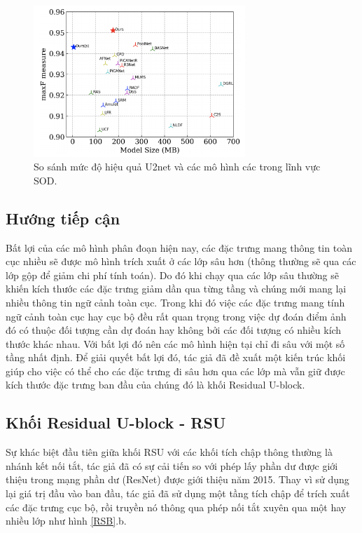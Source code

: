 \begin{figure}[H]
	\begin{center}
		\includegraphics[width=8cm]{images/blood/u2_benk.png}
		\caption{So sánh mức độ hiệu quả U2net và các mô hình các trong lĩnh vực SOD\cite{u2-net}.}
		\label{BenU2net}
	\end{center}
\end{figure}
\vspace{-1.0cm}

\subsection{Hướng tiếp cận}
Bất lợi của các mô hình phân đoạn hiện nay, các đặc trưng mang thông tin toàn cục nhiều sẽ được mô hình trích xuất ở các lớp sâu hơn (thông thường sẽ qua các lớp gộp để giảm chi phí tính toán). Do đó khi chạy qua các lớp sâu thường sẽ khiến kích thước các đặc trưng giảm dần qua từng tầng và chúng mới mang lại nhiều thông tin ngữ cảnh toàn cục. Trong khi đó việc các đặc trưng mang tính ngữ cảnh toàn cục hay cục bộ đều rất quan trọng trong việc dự đoán điểm ảnh đó có thuộc đối tượng cần dự đoán hay không bởi các đối tượng có nhiều kích thước khác nhau. Với bất lợi đó nên các mô hình hiện tại chỉ đi sâu với một số tầng nhất định. Để giải quyết bất lợi đó, tác giả đã đề xuất một kiến trúc khối giúp cho việc có thể cho các đặc trưng đi sâu hơn qua các lớp mà vẫn giữ được kích thước đặc trưng ban đầu của chúng đó là khối Residual U-block.

\subsection{Khối Residual U-block - RSU}
Sự khác biệt đầu tiên giữa khối RSU với các khối tích chập thông thường là nhánh kết nối tắt, tác giả đã có sự cải tiến so với phép lấy phần dư được giới thiệu trong mạng phần dư (ResNet) \cite{resnet} được giới thiệu năm 2015. Thay vì sử dụng lại giá trị đầu vào ban đầu, tác giả đã sử dụng một tầng tích chập để trích xuất các đặc trưng cục bộ, rồi truyền nó thông qua phép nối tắt xuyên qua một hay nhiều lớp như hình \ref{RSB}.b.

